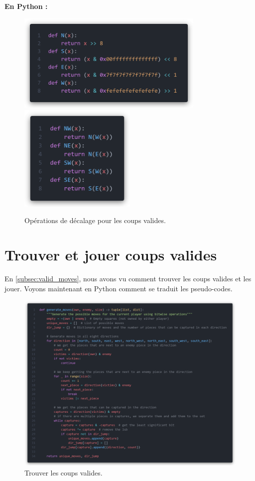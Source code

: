 \noindent \textbf{En Python :}
\begin{figure}[H]
    \centering
    \includegraphics[width=0.8\textwidth]{ressources/operateurCardinaux.png}
    \includegraphics[width=0.5\textwidth]{ressources/operateurCardinauxComposes.png}
    \caption{Opérations de décalage pour les coups valides.}
    \label{fig:shift_ops}
\end{figure}

\section{Trouver et jouer coups valides}
\label{app:valid_moves}

En \ref{subsec:valid_moves}, nous avons vu comment trouver les coups valides et les jouer. Voyons maintenant en Python comment se traduit les pseudo-codes.

\begin{figure}[H]
    \centering
    \includegraphics[width=1\textwidth]{ressources/generate_moves.png}
    \caption{Trouver les coups valides.}
    \label{fig:generate_moves}
\end{figure}

